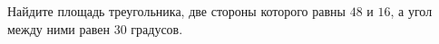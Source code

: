 \begin{ex}
	\begin{condition}
		Найдите площадь треугольника, две стороны которого равны \( 48  \) и \( 16 \), а угол между ними равен \( 30  \) градусов.
	\end{condition}
\end{ex}